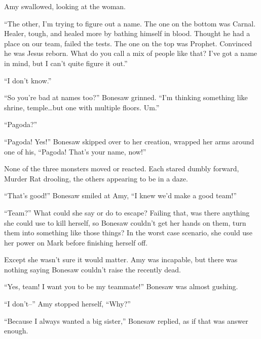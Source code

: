 Amy swallowed, looking at the woman.



``The other, I'm trying to figure out a name.  The one on the bottom was Carnal.  Healer, tough, and healed more by bathing himself in blood.  Thought he had a place on our team, failed the tests.  The one on the top was Prophet.  Convinced he was Jesus reborn.  What do you call a mix of people like that?  I've got a name in mind, but I can't quite figure it out.''



``I don't know.''



``So you're bad at names too?'' Bonesaw grinned.  ``I'm thinking something like shrine, temple\ldots but one with multiple floors.  Um.''



``Pagoda?''



``Pagoda!  Yes!''  Bonesaw skipped over to her creation, wrapped her arms around one of his, ``Pagoda!  That's your name, now!''



None of the three monsters moved or reacted.  Each stared dumbly forward, Murder Rat drooling, the others appearing to be in a daze.



``That's good!''  Bonesaw smiled at Amy, ``I knew we'd make a good team!''



``Team?''  What could she say or do to escape?  Failing that, was there anything she could use to kill herself, so Bonesaw couldn't get her hands on them, turn them into something like those things?  In the worst case scenario, she could use her power on Mark before finishing herself off.



Except she wasn't sure it would matter.  Amy was incapable, but there was nothing saying Bonesaw couldn't raise the recently dead.



``Yes, team!  I want you to be my teammate!''  Bonesaw was almost gushing.



``I don't--'' Amy stopped herself, ``Why?''



``Because I always wanted a big sister,'' Bonesaw replied, as if that was answer enough.



